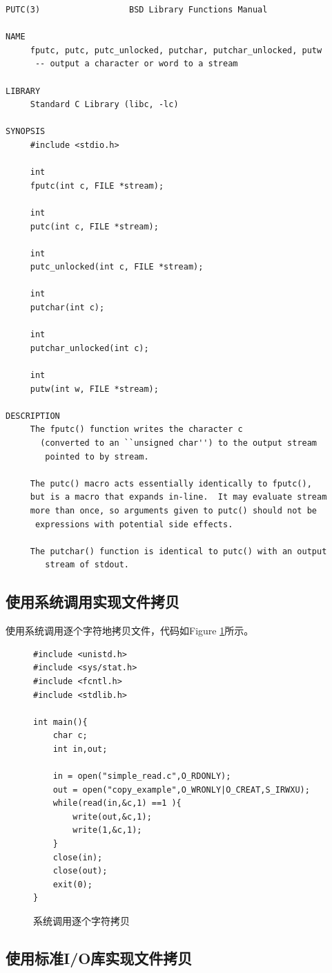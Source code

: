 \begin{lstlisting}
PUTC(3)                  BSD Library Functions Manual 

NAME
     fputc, putc, putc_unlocked, putchar, putchar_unlocked, putw
      -- output a character or word to a stream

LIBRARY
     Standard C Library (libc, -lc)

SYNOPSIS
     #include <stdio.h>

     int
     fputc(int c, FILE *stream);

     int
     putc(int c, FILE *stream);

     int
     putc_unlocked(int c, FILE *stream);

     int
     putchar(int c);

     int
     putchar_unlocked(int c);

     int
     putw(int w, FILE *stream);

DESCRIPTION
     The fputc() function writes the character c 
       (converted to an ``unsigned char'') to the output stream
        pointed to by stream.

     The putc() macro acts essentially identically to fputc(), 
     but is a macro that expands in-line.  It may evaluate stream 
     more than once, so arguments given to putc() should not be
      expressions with potential side effects.

     The putchar() function is identical to putc() with an output 
        stream of stdout.
\end{lstlisting}
\subsection{使用系统调用实现文件拷贝}
使用系统调用逐个字符地拷贝文件，代码如Figure \ref{syscall}所示。
\begin{figure}
\begin{lstlisting}
#include <unistd.h>
#include <sys/stat.h>
#include <fcntl.h>
#include <stdlib.h>

int main(){
	char c;
	int in,out;
	
	in = open("simple_read.c",O_RDONLY);
	out = open("copy_example",O_WRONLY|O_CREAT,S_IRWXU);
	while(read(in,&c,1) ==1 ){
		write(out,&c,1);
		write(1,&c,1);
	}
	close(in);
	close(out);
	exit(0);
}

\end{lstlisting}
\caption{系统调用逐个字符拷贝}
\label{syscall}
\end{figure}
\subsection{使用标准I/O库实现文件拷贝}
